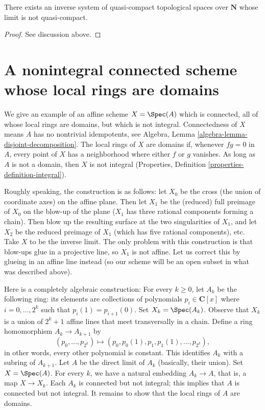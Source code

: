 \begin{lemma}
\label{lemma-lim-not-quasi-compact}
There exists an inverse system of quasi-compact topological spaces
over $\mathbf{N}$ whose limit is not quasi-compact.
\end{lemma}

\begin{proof}
See discussion above.
\end{proof}






\section{A nonintegral connected scheme whose local rings are domains}
\label{section-connected-locally-integral-not-integral}

\noindent
We give an example of an affine scheme $X = \Spec(A)$ which is
connected, all of whose local rings are domains, but which is not integral.
Connectedness of $X$ means $A$ has no nontrivial idempotents, see
Algebra, Lemma \ref{algebra-lemma-disjoint-decomposition}.
The local rings of $X$ are domains if, whenever $fg = 0$ in $A$, every
point of $X$ has a neighborhood where either $f$ or $g$ vanishes.
As long as $A$ is not a domain, then $X$ is not integral
(Properties, Definition \ref{properties-definition-integral}).

\medskip\noindent
Roughly speaking, the construction is as follows: let $X_0$ be the cross
(the union of coordinate axes) on the affine plane. Then let $X_1$ be
the (reduced) full preimage of $X_0$ on the blow-up of the plane ($X_1$
has three rational components forming a chain).  Then blow up the
resulting surface at the two singularities of $X_1$, and let $X_2$ be
the reduced preimage of $X_1$ (which has five rational components), etc.
Take $X$ to be the inverse limit. The only problem with this construction
is that blow-ups glue in a projective line, so $X_1$ is not affine. Let us
correct this by glueing in an affine line instead (so our scheme will be an
open subset in what was described above).

\medskip\noindent
Here is a completely algebraic construction: For every $k \ge 0$, let $A_k$
be the following ring: its elements are collections of
polynomials $p_i \in \mathbf{C}[x]$ where $i = 0, \ldots, 2^k$ such that
$p_i(1) = p_{i + 1}(0)$. Set $X_k = \Spec(A_k)$. Observe that $X_k$ is
a union of $2^k + 1$ affine lines that meet transversally in a chain.
Define a ring homomorphism $A_k \to A_{k + 1}$ by
$$
(p_0, \ldots, p_{2^k})
\longmapsto
(p_0, p_0(1), p_1, p_1(1), \ldots, p_{2^k}),
$$
in other words, every other polynomial is constant. This identifies
$A_k$ with a subring of $A_{k + 1}$. Let $A$ be the direct limit of $A_k$
(basically, their union). Set $X = \Spec(A)$. For every $k$, we have
a natural embedding $A_k \to A$, that is, a map $X\to X_k$.
Each $A_k$ is connected but not integral; this implies that $A$ is
connected but not integral. It remains to show that the local rings of
$A$ are domains.

